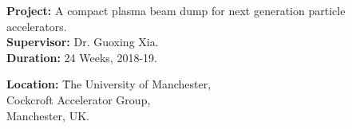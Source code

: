 \documentclass[%
onecolumn, notitlepage,
 amsmath,amssymb,
 aps,
]{article}
\begin{document}
\thispagestyle{firstpage}
\begin{minipage}{0.7\textwidth}
\vspace{-5pt}
\noindent \textbf{Project:} A compact plasma beam dump for next generation particle accelerators.\\
\noindent \textbf{Supervisor:} Dr. Guoxing Xia.\\ 
\noindent \textbf{Duration:} 24 Weeks, 2018-19.\vspace{-19pt}\\
\begin{tabbing}
\textbf{Location:}  \=The University of Manchester,\\
\>Cockcroft Accelerator Group,\\
\>Manchester, UK.
\end{tabbing}
\end{minipage}
\end{document}
